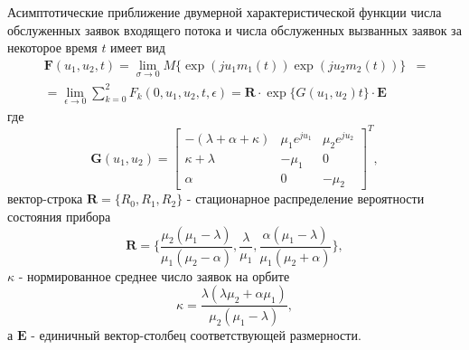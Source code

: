 \begin{theorem}
Асимптотические приближение двумерной характеристической функции числа обслуженных заявок входящего потока и числа обслуженных вызванных заявок за некоторое время $t$ имеет вид
\begin{equation*} \label{theor}
	\begin{split}
	\boldsymbol{F}(u_{1},u_{2},t) =  \lim_{\sigma \xrightarrow{} 0} M\{\exp(ju_{1}m_{1}(t))\exp(ju_{2}m_{2}(t))\} &= 
	\\
= \lim_{\epsilon \xrightarrow{} 0} \sum_{k=0}^{2}F_{k}(0,u_{1},u_{2},t,\epsilon) = \boldsymbol{R} \cdot \exp\{G(u_{1},u_{2})t\} \cdot \boldsymbol{E}
	\end{split}
\end{equation*}
где 
\begin{equation*}
	\boldsymbol{G}(u_{1},u_{2})=\begin{bmatrix}
		-(\lambda + \alpha + \kappa) & \mu_{1}e^{ju_{1}} &  \mu_{2}e^{ju_{2}}\\
		\kappa+\lambda & -\mu_{1} & 0\\
		\alpha & 	0 &	-\mu_{2}
	\end{bmatrix}^{T},
\end{equation*}
вектор-строка $\boldsymbol{R}=\{R_{0},R_{1},R_{2}\}$ - стационарное распределение вероятности состояния прибора
 \begin{equation*}
 	\boldsymbol{R}=\{\frac{\mu_{2}(\mu_{1} - \lambda)}{\mu_{1}(\mu_{2} - \alpha)},\frac{\lambda}{\mu_{1}},\frac{\alpha(\mu_{1} - \lambda)}{\mu_{1}(\mu_{2} + \alpha)}\},
 \end{equation*}
$\kappa$ - нормированное среднее число заявок на орбите
\begin{equation*}
\kappa = \frac{\lambda(\lambda \mu_{2} + \alpha \mu_{1})}{\mu_{2}(\mu_{1} - \lambda)},
\end{equation*}
а $\boldsymbol{E}$ - единичный вектор-столбец соответствующей размерности.
\end{theorem}
